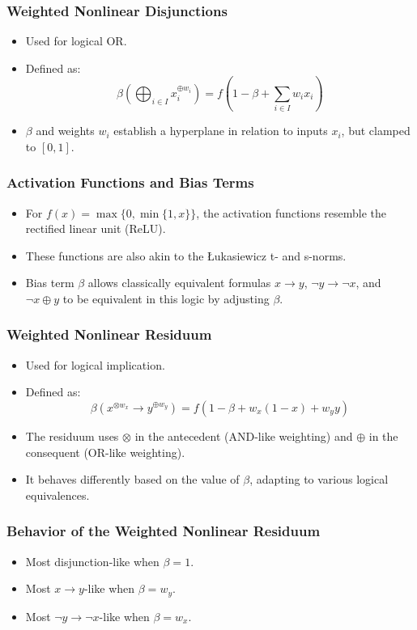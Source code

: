 \documentclass{beamer}
\begin{document}
\begin{frame}
\frametitle{Weighted Nonlinear Disjunctions}
\begin{itemize}
    \item Used for logical OR.
    \item Defined as:
    \[ \beta (\bigoplus_{i \in I} x_i^{\oplus w_i}) = f\left(1 - \beta + \sum_{i \in I} w_i x_i\right) \]
    \item \( \beta \) and weights \( w_i \) establish a hyperplane in relation to inputs \( x_i \), but clamped to \( [0, 1] \).
\end{itemize}
\end{frame}

\begin{frame}
\frametitle{Activation Functions and Bias Terms}
\begin{itemize}
    \item For \( f(x) = \max\{0, \min\{1, x\}\} \), the activation functions resemble the rectified linear unit (ReLU).
    \item These functions are also akin to the Łukasiewicz t- and s-norms.
    \item Bias term \( \beta \) allows classically equivalent formulas \( x \rightarrow y \), \( \neg y \rightarrow \neg x \), and \( \neg x \oplus y \) to be equivalent in this logic by adjusting \( \beta \).
\end{itemize}
\end{frame}

\begin{frame}
\frametitle{Weighted Nonlinear Residuum}
\begin{itemize}
    \item Used for logical implication.
    \item Defined as:
    \[ \beta (x^{\otimes w_x} \rightarrow y^{\oplus w_y}) = f\left(1 - \beta + w_x(1 - x) + w_y y\right) \]
    \item The residuum uses \( \otimes \) in the antecedent (AND-like weighting) and \( \oplus \) in the consequent (OR-like weighting).
    \item It behaves differently based on the value of \( \beta \), adapting to various logical equivalences.
\end{itemize}
\end{frame}

\begin{frame}
\frametitle{Behavior of the Weighted Nonlinear Residuum}
\begin{itemize}
    \item Most disjunction-like when \( \beta = 1 \).
    \item Most \( x \rightarrow y \)-like when \( \beta = w_y \).
    \item Most \( \neg y \rightarrow \neg x \)-like when \( \beta = w_x \).
\end{itemize}
\end{frame}
\end{document}
